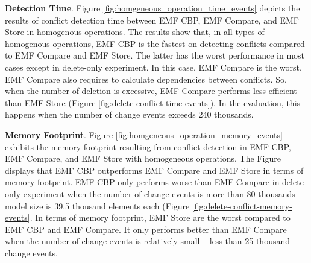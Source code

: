\textbf{Detection Time}. Figure \ref{fig:homgeneous_operation_time_events} depicts the results of conflict detection time between EMF CBP, EMF Compare, and EMF Store in homogenous operations. The results show that, in all types of homogenous operations, EMF CBP is the fastest on detecting conflicts compared to EMF Compare and EMF Store. The latter has the worst performance in most cases except in delete-only experiment. In this case, EMF Compare is the worst. EMF Compare also requires to calculate dependencies between conflicts. So, when the number of deletion is excessive, EMF Compare performs less efficient than EMF Store (Figure \ref{fig:delete-conflict-time-events}). In the evaluation, this happens when the number of change events exceeds 240 thousands.

\textbf{Memory Footprint}. Figure \ref{fig:homgeneous_operation_memory_events} exhibits the memory footprint resulting from conflict detection in EMF CBP, EMF Compare, and EMF Store with homogeneous operations. The Figure displays that EMF CBP outperforms EMF Compare and EMF Store in terms of memory footprint. EMF CBP only performs worse than EMF Compare in delete-only experiment when the number of change events is more than 80 thousands -- model size is 39.5 thousand elements each (Figure \ref{fig:delete-conflict-memory-events}. In terms of memory footprint, EMF Store are the worst compared to EMF CBP and EMF Compare. It only performs better than EMF Compare when the number of change events is relatively small -- less than 25 thousand change events. 

